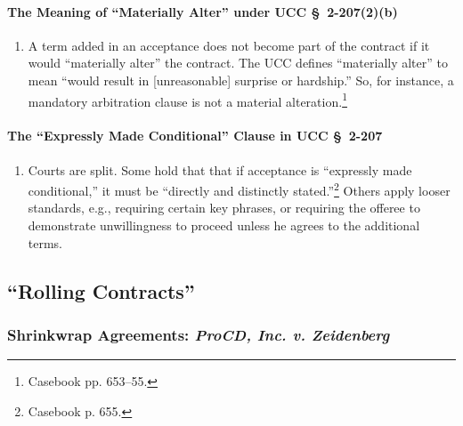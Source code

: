 \paragraph{The Meaning of ``Materially Alter'' under UCC \S\ 2-207(2)(b)}

\begin{enumerate}
    \item A term added in an acceptance does not become part of the contract 
    if it would ``materially alter'' the contract. The UCC defines 
    ``materially alter'' to mean ``would result in [unreasonable] surprise or 
    hardship.'' So, for instance, a mandatory arbitration clause is not a 
    material alteration.\footnote{Casebook pp. 653--55.}
\end{enumerate}

\paragraph{The ``Expressly Made Conditional'' Clause in UCC \S\ 2-207}

\begin{enumerate}
    \item Courts are split. Some hold that that if acceptance is ``expressly 
    made conditional,'' it must be ``directly and distinctly 
    stated.''\footnote{Casebook p. 655.} Others apply looser standards, e.g., 
    requiring certain key phrases, or requiring the offeree to demonstrate 
    unwillingness to proceed unless he agrees to the additional terms.
\end{enumerate}

\subsection{``Rolling Contracts''}

\subsubsection{Shrinkwrap Agreements: \emph{ProCD, Inc. v. Zeidenberg}}

